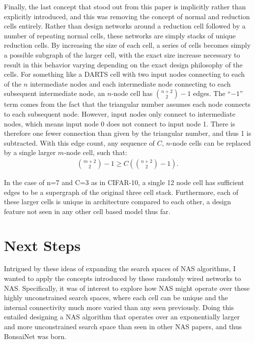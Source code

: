 Finally, the last concept that stood out from this paper is implicitly rather than explicitly introduced, and this
was removing the concept of normal and reduction cells entirely. Rather than design networks around a reduction cell
followed by a number of repeating normal cells, these networks are simply stacks of unique reduction cells.
By increasing the size of each cell, a series of cells becomes simply a possible subgraph of the larger cell, with
the exact size increase necessary to result in this behavior varying depending on the exact design philosophy of the cells.
For something like a DARTS cell with two input nodes connecting to each of the $n$ intermediate nodes and each intermediate node
connecting to each subsequent intermediate node, an $n$-node cell has $\binom{n+2}{2}-1$ edges. The ``$-1$'' term comes
from the fact that the triangular number assumes each node connects
to each subsequent node. However, input nodes only connect to intermediate nodes, which means input node 0 does not connect to input node 1.
There is therefore one fewer connection than given
by the triangular number, and thus 1 is subtracted. With this edge count, any sequence of $C$, $n$-node cells can be replaced by a single larger $m$-node cell,
such that:
\begin{align}
\binom{m+2}{2}-1 \ge C\left(\binom{n+2}{2} - 1\right). \label{eq: cell_edges}
\end{align}

In the case of n=7 and C=3 as in CIFAR-10, a single 12 node cell has
sufficient edges to be a supergraph of the original three cell stack. Furthermore, each of these larger cells is unique
in architecture compared to each other, a design feature not seen in any other cell based model thus far.

\section{Next Steps}
Intrigued by these ideas of expanding the search spaces of NAS algorithms, I wanted to apply the concepts introduced by
these randomly wired networks to NAS. Specifically, it was of interest to explore how NAS might operate over these highly unconstrained
search spaces, where each cell can be unique and the internal connectivity much more varied than any seen previously.
Doing this entailed designing a NAS algorithm that operates over an exponentially larger and more unconstrained
search space than seen in other NAS papers, and thus BonsaiNet was born.

